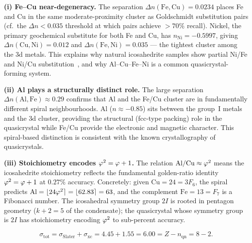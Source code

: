 \begin{remark}
\label{P11:rem:icosahedrite_structure}
\textbf{(i) Fe--Cu near-degeneracy.}
The separation $\Delta n(\mathrm{Fe,Cu}) = 0.0234$ places Fe and Cu
in the same moderate-proximity cluster as Goldschmidt substitution pairs
(cf.\ the $\Delta n < 0.035$ threshold at which pairs achieve $>70\%$
recall).
Nickel, the primary geochemical substitute for both Fe and Cu,
has $n_{\mathrm{Ni}} = -0.5997$, giving
$\Delta n(\mathrm{Cu,Ni}) = 0.012$ and $\Delta n(\mathrm{Fe,Ni}) = 0.035$
--- the tightest cluster among the 3d metals.
This explains why natural icosahedrite samples show partial Ni/Fe
and Ni/Cu substitution~\cite{Bindi2009}, and why
Al--Cu--Fe--Ni is a common quasicrystal-forming system.

\textbf{(ii) Al plays a structurally distinct role.}
The large separation $\Delta n(\mathrm{Al,Fe}) \approx 0.29$
confirms that Al and the Fe/Cu cluster are in fundamentally different
spiral neighbourhoods.
Al ($n \approx -0.85$) sits between the group~I metals and the 3d cluster,
providing the structural (fcc-type packing) role in the quasicrystal
while Fe/Cu provide the electronic and magnetic character.
This spiral-based distinction is consistent with the known crystallography
of quasicrystals.

\textbf{(iii) Stoichiometry encodes $\varphi^2 = \varphi+1$.}
The relation $\mathrm{Al}/\mathrm{Cu} \approx \varphi^2$ means the icosahedrite
stoichiometry reflects the fundamental golden-ratio identity $\varphi^2 = \varphi+1$
at $0.27\%$ accuracy.
Concretely: given $\mathrm{Cu} = 24 = 3F_6$, the spiral predicts
$\mathrm{Al} = \lfloor 24\varphi^2 \rceil = \lfloor 62.83 \rceil = 63$,
and the complement $\mathrm{Fe} = 13 = F_7$ is a Fibonacci number.
The icosahedral symmetry group $2I$ is rooted in pentagon geometry
($k+2=5$ of the condensate); the quasicrystal whose symmetry group
is $2I$ has stoichiometry encoding $\varphi^2$ to sub-percent accuracy.
\end{remark}

\begin{equation}
  \sigma_\mathrm{tot}
  = \sigma_\mathrm{Slater} + \sigma_\mathrm{xc}
  = 4.45 + 1.55
  = 6.00
  = Z - n_\mathrm{qn}
  = 8 - 2.
  \label{P11:eq:sigma_total}
\end{equation}


